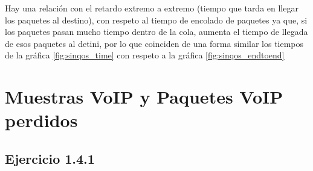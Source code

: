 Hay una relación con el retardo extremo a extremo (tiempo que tarda en llegar los paquetes al destino), con respeto al tiempo de encolado
de paquetes ya que, si los paquetes pasan mucho tiempo dentro de la cola, aumenta el tiempo de llegada de esos paquetes al detini, por lo que
coinciden de una forma similar los tiempos de la gráfica \ref{fig:sinqos_time} con respeto a la gráfica \ref{fig:sinqos_endtoend}


\section{Muestras VoIP y Paquetes VoIP perdidos}

\subsection{Ejercicio 1.4.1}